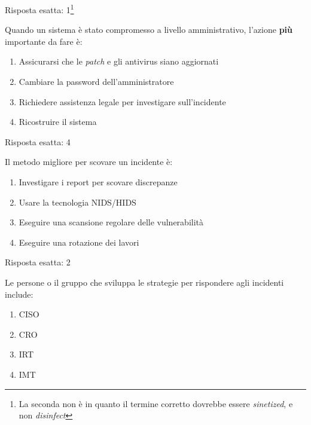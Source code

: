 \begin{Answer} [
  ref={esIRBC2},
  number={2}
  ]

  \Question Risposta esatta: 1\footnote{La seconda non \`e in quanto il termine
corretto dovrebbe essere \textit{sinetized}, e non \textit{disinfect}}
\end{Answer}


\begin{Exercise} [
  title={Quiz},
  label={esIRBC3}
  ]

  \Question Quando un sistema \`e stato compromesso a livello amministrativo,
l'azione \textbf{pi\`u} importante da fare \`e:
\begin{enumerate}
 \item Assicurarsi che le \textit{patch} e gli antivirus siano aggiornati
 \item Cambiare la password dell'amministratore
 \item Richiedere assistenza legale per investigare sull'incidente
 \item Ricostruire il sistema
\end{enumerate}
\end{Exercise}

\begin{Answer} [
  ref={esIRBC3},
  number={3}
  ]

  \Question Risposta esatta: 4
\end{Answer}


\begin{Exercise} [
  title={Quiz},
  label={esIRBC4}
  ]

  \Question Il metodo migliore per scovare un incidente \`e:
  \begin{enumerate}
   \item Investigare i report per scovare discrepanze
   \item Usare la tecnologia NIDS/HIDS
   \item Eseguire una scansione regolare delle vulnerabilit\`a
   \item Eseguire una rotazione dei lavori
  \end{enumerate}
\end{Exercise}

\begin{Answer} [
  ref={esIRBC4},
  number={4}
  ]

  \Question Risposta esatta: 2
\end{Answer}


\begin{Exercise} [
  title={Quiz},
  label={esIRBC5}
  ]

  \Question Le persone o il gruppo che sviluppa le strategie per rispondere
agli incidenti include:
\begin{enumerate}
 \item CISO
 \item CRO
 \item IRT
 \item IMT
\end{enumerate}

\end{Exercise}

